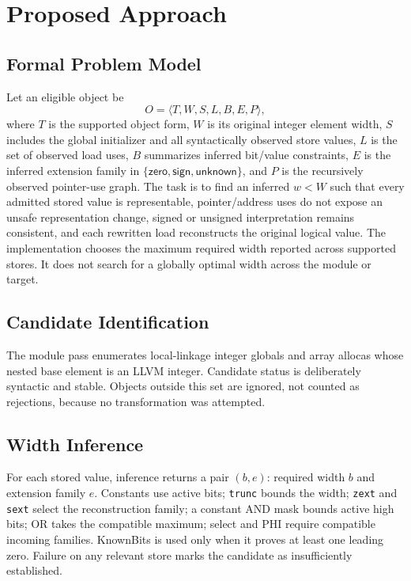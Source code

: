 \documentclass[11pt,twocolumn]{article}
\begin{document}
\section{Proposed Approach}

\subsection{Formal Problem Model}

Let an eligible object be
\[
O=\langle T,W,S,L,B,E,P\rangle,
\]
where $T$ is the supported object form, $W$ is its original integer element
width, $S$ includes the global initializer and all syntactically observed store
values, $L$ is the set of observed load
uses, $B$ summarizes inferred bit/value constraints, $E$ is the inferred
extension family in $\{\mathsf{zero},\mathsf{sign},\mathsf{unknown}\}$, and $P$
is the recursively observed pointer-use graph. The task is to find an inferred
$w<W$ such that every admitted stored value is representable, pointer/address
uses do not expose an unsafe representation change, signed or unsigned
interpretation remains consistent, and each rewritten load reconstructs the
original logical value. The implementation chooses the maximum required width
reported across supported stores. It does not search for a globally optimal
width across the module or target.

\subsection{Candidate Identification}

The module pass enumerates local-linkage integer globals and array allocas whose
nested base element is an LLVM integer. Candidate status is deliberately
syntactic and stable. Objects outside this set are ignored, not counted as
rejections, because no transformation was attempted.

\subsection{Width Inference}

For each stored value, inference returns a pair $(b,e)$: required width $b$ and
extension family $e$. Constants use active bits; \texttt{trunc} bounds the width;
\texttt{zext} and \texttt{sext} select the reconstruction family; a constant AND
mask bounds active high bits; OR takes the compatible maximum; select and PHI
require compatible incoming families. KnownBits is used only when it proves at
least one leading zero. Failure on any relevant store marks the candidate as
insufficiently established.
\end{document}
